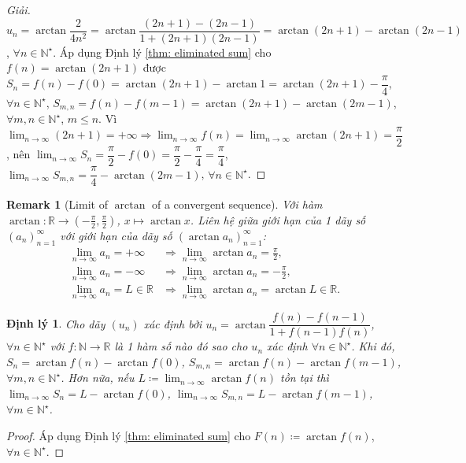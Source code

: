 \documentclass{article}
\newtheorem{dinhly}{Định lý}
\newtheorem{remark}{Remark}
\begin{document}
\begin{proof}[Giải]
	$u_n = \arctan\dfrac{2}{4n^2} = \arctan\dfrac{(2n + 1) - (2n - 1)}{1 + (2n + 1)(2n - 1)} = \arctan(2n + 1) - \arctan(2n - 1)$, $\forall n\in\mathbb{N}^\star$. Áp dụng Định lý \ref{thm: eliminated sum} cho $f(n) = \arctan(2n + 1)$ được $S_n = f(n) - f(0) = \arctan(2n + 1) - \arctan1 = \arctan(2n + 1) - \dfrac{\pi}{4}$, $\forall n\in\mathbb{N}^\star$, $S_{m,n} = f(n) - f(m - 1) = \arctan(2n + 1) - \arctan(2m - 1)$, $\forall m,n\in\mathbb{N}^\star$, $m\le n$. Vì $\lim_{n\to\infty} (2n + 1) = +\infty\Rightarrow\lim_{n\to\infty} f(n) = \lim_{n\to\infty} \arctan(2n + 1) = \dfrac{\pi}{2}$, nên $\lim_{n\to\infty} S_n = \dfrac{\pi}{2} - f(0) = \dfrac{\pi}{2} - \dfrac{\pi}{4} = \dfrac{\pi}{4}$, $\lim_{n\to\infty} S_{m,n} = \dfrac{\pi}{4} - \arctan(2m - 1)$, $\forall n\in\mathbb{N}^\star$.
\end{proof}

\begin{remark}[Limit of $\arctan$ of a convergent sequence]
	Với hàm $\arctan:\mathbb{R}\to\left(-\frac{\pi}{2},\frac{\pi}{2}\right)$, $x\mapsto\arctan x$. Liên hệ giữa giới hạn của 1 dãy số $(a_n)_{n=1}^\infty$ với giới hạn của dãy số $(\arctan a_n)_{n=1}^\infty$:
	\begin{align*}
		\lim_{n\to\infty} a_n = +\infty&\Rightarrow\lim_{n\to\infty} \arctan a_n = \frac{\pi}{2},\\
		\lim_{n\to\infty} a_n = -\infty&\Rightarrow\lim_{n\to\infty} \arctan a_n = -\frac{\pi}{2},\\
		\lim_{n\to\infty} a_n = L\in\mathbb{R}&\Rightarrow\lim_{n\to\infty} \arctan a_n = \arctan L\in\mathbb{R}.
	\end{align*}
\end{remark}

\begin{dinhly}
	Cho dãy $(u_n)$ xác định bởi $u_n = \arctan\dfrac{f(n) - f(n - 1)}{1 + f(n - 1)f(n)}$, $\forall n\in\mathbb{N}^\star$ với $f:\mathbb{N}\to\mathbb{R}$ là 1 hàm số nào đó sao cho $u_n$ xác định $\forall n\in\mathbb{N}^\star$. Khi đó, $S_n = \arctan f(n) - \arctan f(0)$, $S_{m,n} = \arctan f(n) - \arctan f(m - 1)$, $\forall m,n\in\mathbb{N}^\star$. Hơn nữa, nếu $L\coloneqq\lim_{n\to\infty} \arctan f(n)$ tồn tại thì $\lim_{n\to\infty} S_n = L - \arctan f(0)$, $\lim_{n\to\infty} S_{m,n} = L - \arctan f(m - 1)$, $\forall m\in\mathbb{N}^\star$.
\end{dinhly}

\begin{proof}
	Áp dụng Định lý \ref{thm: eliminated sum} cho $F(n)\coloneqq\arctan f(n)$, $\forall n\in\mathbb{N}^\star$.
\end{proof}
\end{document}

